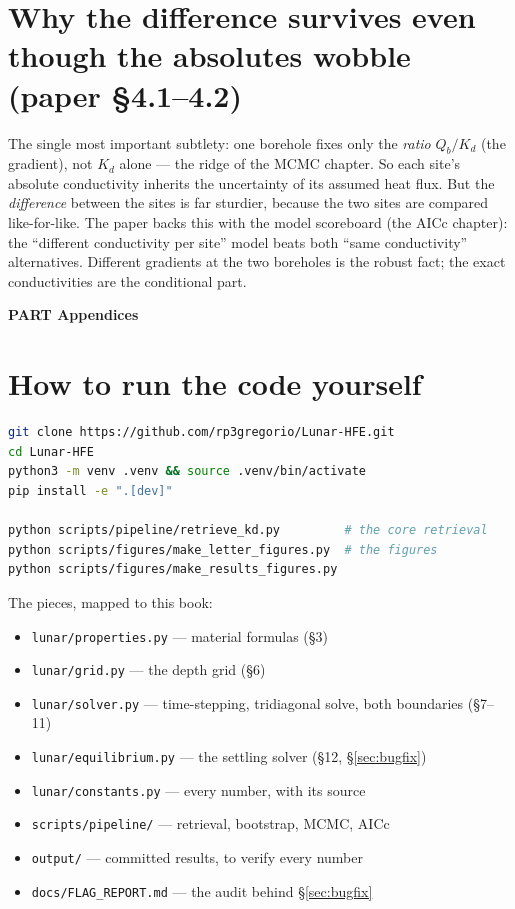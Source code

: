 \documentclass[11pt]{article}
\newcounter{partno}
\newcommand{\partdivider}[1]{%
  \par\addvspace{10pt}\refstepcounter{partno}\FloatBarrier
  \noindent\begin{tcolorbox}[colback=teal!14!white,colframe=teal!50!black,
    boxrule=1pt,arc=2pt,left=10pt,right=10pt,top=5pt,bottom=5pt,
    before skip=4pt,after skip=6pt]
  \centering\large\bfseries\color{teal!40!black}
  PART \Roman{partno}\quad\textbullet\quad #1\end{tcolorbox}\par\addvspace{3pt}}
\renewcommand{\partdivider}[1]{\par\addvspace{10pt}\refstepcounter{partno}%
    \FloatBarrier\noindent\begin{tcolorbox}[colback=gray!15!white,colframe=black,
      boxrule=1pt,arc=2pt,left=10pt,right=10pt,top=5pt,bottom=5pt,
      before skip=4pt,after skip=6pt]\centering\large\bfseries\color{black}
    PART \Roman{partno}\quad\textbullet\quad #1\end{tcolorbox}\par\addvspace{3pt}}
\begin{document}
\section{Why the difference survives even though the absolutes wobble (paper \S4.1--4.2)}
The single most important subtlety: one borehole fixes only the
\emph{ratio} $Q_b/K_d$ (the gradient), not $K_d$ alone --- the ridge of
the MCMC chapter. So each site's absolute conductivity inherits the
uncertainty of its assumed heat flux. But the \emph{difference} between
the sites is far sturdier, because the two sites are compared like-for-like.
The paper backs this with the model scoreboard (the AICc chapter): the
``different conductivity per site'' model beats both ``same conductivity''
alternatives. Different gradients at the two boreholes is the robust fact;
the exact conductivities are the conditional part.

\partdivider{Appendices}

\section{How to run the code yourself}
\begin{lstlisting}[language=bash,numbers=none,keywordstyle=\color{black}]
git clone https://github.com/rp3gregorio/Lunar-HFE.git
cd Lunar-HFE
python3 -m venv .venv && source .venv/bin/activate
pip install -e ".[dev]"

python scripts/pipeline/retrieve_kd.py         # the core retrieval
python scripts/figures/make_letter_figures.py  # the figures
python scripts/figures/make_results_figures.py
\end{lstlisting}
The pieces, mapped to this book:
\begin{itemize}
\item \texttt{lunar/properties.py} --- material formulas (\S3)
\item \texttt{lunar/grid.py} --- the depth grid (\S6)
\item \texttt{lunar/solver.py} --- time-stepping, tridiagonal solve, both
      boundaries (\S7--11)
\item \texttt{lunar/equilibrium.py} --- the settling solver
      (\S12, \S\ref{sec:bugfix})
\item \texttt{lunar/constants.py} --- every number, with its source
\item \texttt{scripts/pipeline/} --- retrieval, bootstrap, MCMC, AICc
\item \texttt{output/} --- committed results, to verify every number
\item \texttt{docs/FLAG\_REPORT.md} --- the audit behind \S\ref{sec:bugfix}
\end{itemize}
\end{document}
